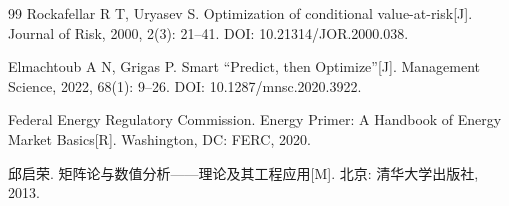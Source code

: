 \begin{thebibliography}{99}
Rockafellar R T, Uryasev S.
Optimization of conditional value-at-risk[J].
Journal of Risk, 2000, 2(3): 21--41.
DOI: 10.21314/JOR.2000.038.

Elmachtoub A N, Grigas P.
Smart ``Predict, then Optimize''[J].
Management Science, 2022, 68(1): 9--26.
DOI: 10.1287/mnsc.2020.3922.

Federal Energy Regulatory Commission.
Energy Primer: A Handbook of Energy Market Basics[R].
Washington, DC: FERC, 2020.

邱启荣.
矩阵论与数值分析——理论及其工程应用[M].
北京: 清华大学出版社, 2013.

\end{thebibliography}
